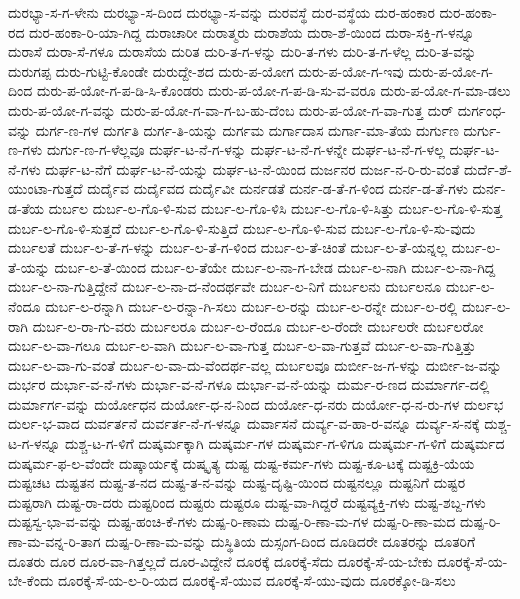 {ದುರಭ್ಯಾ-ಸ-ಗ-ಳೇನು
ದುರಭ್ಯಾ-ಸ-ದಿಂದ
ದುರಭ್ಯಾ-ಸ-ವನ್ನು
ದುರವಸ್ಥೆ
ದುರ-ವಸ್ಥೆಯ
ದುರ-ಹಂಕಾರ
ದುರ-ಹಂಕಾ-ರದ
ದುರ-ಹಂಕಾ-ರಿ-ಯಾ-ಗಿದ್ದ
ದುರಾಚಾರೀ
ದುರಾತ್ಮರು
ದುರಾಶೆಯ
ದುರಾ-ಶೆ-ಯಿಂದ
ದುರಾ-ಸಕ್ತಿ-ಗ-ಳನ್ನೂ
ದುರಾಸೆ
ದುರಾ-ಸೆ-ಗಳೂ
ದುರಾಸೆಯ
ದುರಿತ
ದುರಿ-ತ-ಗ-ಳನ್ನು
ದುರಿ-ತ-ಗಳು
ದುರಿ-ತ-ಗ-ಳೆಲ್ಲ
ದುರಿ-ತ-ವನ್ನು
ದುರುಗಪ್ಪ
ದುರು-ಗುಟ್ಟಿ-ಕೊಂಡೇ
ದುರುದ್ದೇ-ಶದ
ದುರು-ಪ-ಯೋಗ
ದುರು-ಪ-ಯೋ-ಗ-ಇವು
ದುರು-ಪ-ಯೋ-ಗ-ದಿಂದ
ದುರು-ಪ-ಯೋ-ಗ-ಪ-ಡಿ-ಸಿ-ಕೊಂಡರು
ದುರು-ಪ-ಯೋ-ಗ-ಪ-ಡಿ-ಸು-ವ-ವರೂ
ದುರು-ಪ-ಯೋ-ಗ-ಮಾ-ಡಲು
ದುರು-ಪ-ಯೋ-ಗ-ವನ್ನು
ದುರು-ಪ-ಯೋ-ಗ-ವಾ-ಗ-ಬ-ಹು-ದೆಂಬ
ದುರು-ಪ-ಯೋ-ಗ-ವಾ-ಗುತ್ತ
ದುರ್
ದುರ್ಗಂಧ-ವನ್ನು
ದುರ್ಗ-ಣ-ಗಳ
ದುರ್ಗತಿ
ದುರ್ಗ-ತಿ-ಯನ್ನು
ದುರ್ಗಮ
ದುರ್ಗಾದಾಸ
ದುರ್ಗಾ-ಮಾ-ತೆಯ
ದುರ್ಗುಣ
ದುರ್ಗು-ಣ-ಗಳು
ದುರ್ಗು-ಣ-ಗ-ಳೆಲ್ಲವೂ
ದುರ್ಘ-ಟ-ನೆ-ಗ-ಳನ್ನು
ದುರ್ಘ-ಟ-ನೆ-ಗ-ಳನ್ನೇ
ದುರ್ಘ-ಟ-ನೆ-ಗ-ಳಲ್ಲ
ದುರ್ಘ-ಟ-ನೆ-ಗಳು
ದುರ್ಘ-ಟ-ನೆಗೆ
ದುರ್ಘ-ಟ-ನೆ-ಯನ್ನು
ದುರ್ಘ-ಟ-ನೆ-ಯಿಂದ
ದುರ್ಜನರ
ದುರ್ಜ-ನ-ರಿ-ರು-ವಂತೆ
ದುರ್ದೆ-ಶೆ-ಯುಂಟಾ-ಗುತ್ತದೆ
ದುರ್ದೈವ
ದುರ್ದೈವದ
ದುರ್ದೈವೀ
ದುರ್ನಡತೆ
ದುರ್ನ-ಡ-ತೆ-ಗ-ಳಿಂದ
ದುರ್ನ-ಡ-ತೆ-ಗಳು
ದುರ್ನ-ಡ-ತೆಯ
ದುರ್ಬಲ
ದುರ್ಬ-ಲ-ಗೊ-ಳಿ-ಸುವ
ದುರ್ಬ-ಲ-ಗೊ-ಳಿಸಿ
ದುರ್ಬ-ಲ-ಗೊ-ಳಿ-ಸಿತ್ತು
ದುರ್ಬ-ಲ-ಗೊ-ಳಿ-ಸುತ್ತ
ದುರ್ಬ-ಲ-ಗೊ-ಳಿ-ಸುತ್ತದೆ
ದುರ್ಬ-ಲ-ಗೊ-ಳಿ-ಸುತ್ತಿದೆ
ದುರ್ಬ-ಲ-ಗೊ-ಳಿ-ಸುವ
ದುರ್ಬ-ಲ-ಗೊ-ಳಿ-ಸು-ವುದು
ದುರ್ಬಲತೆ
ದುರ್ಬ-ಲ-ತೆ-ಗ-ಳನ್ನು
ದುರ್ಬ-ಲ-ತೆ-ಗ-ಳಿಂದ
ದುರ್ಬ-ಲ-ತೆ-ಚಿಂತೆ
ದುರ್ಬ-ಲ-ತೆ-ಯನ್ನಲ್ಲ
ದುರ್ಬ-ಲ-ತೆ-ಯನ್ನು
ದುರ್ಬ-ಲ-ತೆ-ಯಿಂದ
ದುರ್ಬ-ಲ-ತೆಯೇ
ದುರ್ಬ-ಲ-ನಾ-ಗ-ಬೇಡ
ದುರ್ಬ-ಲ-ನಾಗಿ
ದುರ್ಬ-ಲ-ನಾ-ಗಿದ್ದ
ದುರ್ಬ-ಲ-ನಾ-ಗುತ್ತಿದ್ದೇನೆ
ದುರ್ಬ-ಲ-ನಾ-ದ-ನೆಂದರ್ಥವೇ
ದುರ್ಬ-ಲ-ನಿಗೆ
ದುರ್ಬಲನು
ದುರ್ಬಲನೂ
ದುರ್ಬ-ಲ-ನೆಂದೂ
ದುರ್ಬ-ಲ-ರನ್ನಾಗಿ
ದುರ್ಬ-ಲ-ರನ್ನಾ-ಗಿ-ಸಲು
ದುರ್ಬ-ಲ-ರನ್ನು
ದುರ್ಬ-ಲ-ರನ್ನೇ
ದುರ್ಬ-ಲ-ರಲ್ಲಿ
ದುರ್ಬ-ಲ-ರಾಗಿ
ದುರ್ಬ-ಲ-ರಾ-ಗು-ವರು
ದುರ್ಬಲರೂ
ದುರ್ಬ-ಲ-ರೆಂದೂ
ದುರ್ಬ-ಲ-ರೆಂದೇ
ದುರ್ಬಲರೇ
ದುರ್ಬಲರೋ
ದುರ್ಬ-ಲ-ವಾ-ಗಲೂ
ದುರ್ಬ-ಲ-ವಾಗಿ
ದುರ್ಬ-ಲ-ವಾ-ಗುತ್ತ
ದುರ್ಬ-ಲ-ವಾ-ಗುತ್ತವೆ
ದುರ್ಬ-ಲ-ವಾ-ಗುತ್ತಿತ್ತು
ದುರ್ಬ-ಲ-ವಾ-ಗು-ವಂತೆ
ದುರ್ಬ-ಲ-ವಾ-ದು-ವೆಂದರ್ಥ-ವಲ್ಲ
ದುರ್ಬಲವೂ
ದುರ್ಬೀ-ಜ-ಗ-ಳನ್ನು
ದುರ್ಬೀ-ಜ-ವನ್ನು
ದುರ್ಭರ
ದುರ್ಭಾ-ವ-ನೆ-ಗಳು
ದುರ್ಭಾ-ವ-ನೆ-ಗಳೂ
ದುರ್ಭಾ-ವ-ನೆ-ಯನ್ನು
ದುರ್ಮ-ರ-ಣದ
ದುರ್ಮಾರ್ಗ-ದಲ್ಲಿ
ದುರ್ಮಾರ್ಗ-ವನ್ನು
ದುರ್ಯೋಧನ
ದುರ್ಯೋ-ಧ-ನ-ನಿಂದ
ದುರ್ಯೋ-ಧ-ನರು
ದುರ್ಯೋ-ಧ-ನ-ರು-ಗಳ
ದುರ್ಲಭ
ದುರ್ಲ-ಭ-ವಾದ
ದುರ್ವರ್ತನೆ
ದುರ್ವರ್ತ-ನೆ-ಗ-ಳನ್ನೂ
ದುರ್ವಾಸನೆ
ದುರ್ವ್ಯ-ವ-ಹಾ-ರ-ವನ್ನೂ
ದುರ್ವ್ಯ-ಸ-ನಕ್ಕೆ
ದುಶ್ಚ-ಟ-ಗ-ಳನ್ನೂ
ದುಶ್ಚ-ಟ-ಗ-ಳಿಗೆ
ದುಷ್ಕರ್ಮಕ್ಕಾಗಿ
ದುಷ್ಕರ್ಮ-ಗಳ
ದುಷ್ಕರ್ಮ-ಗ-ಳಿಗೂ
ದುಷ್ಕರ್ಮ-ಗ-ಳಿಗೆ
ದುಷ್ಕರ್ಮದ
ದುಷ್ಕರ್ಮ-ಫ-ಲ-ವೆಂದೇ
ದುಷ್ಕಾರ್ಯಕ್ಕೆ
ದುಷ್ಕೃತ್ಯ
ದುಷ್ಟ
ದುಷ್ಟ-ಕರ್ಮ-ಗಳು
ದುಷ್ಟ-ಕೂ-ಟಕ್ಕೆ
ದುಷ್ಟಕ್ರಿ-ಯೆಯ
ದುಷ್ಟಚಟ
ದುಷ್ಟತನ
ದುಷ್ಟ-ತ-ನದ
ದುಷ್ಟ-ತ-ನ-ವನ್ನು
ದುಷ್ಟ-ದೃಷ್ಟಿ-ಯಿಂದ
ದುಷ್ಟನಲ್ಲೂ
ದುಷ್ಟನಿಗೆ
ದುಷ್ಟರ
ದುಷ್ಟರಾಗಿ
ದುಷ್ಟ-ರಾ-ದರು
ದುಷ್ಟರಿಂದ
ದುಷ್ಟರು
ದುಷ್ಟರೂ
ದುಷ್ಟ-ವಾ-ಗಿದ್ದರೆ
ದುಷ್ಟವ್ಯಕ್ತಿ-ಗಳು
ದುಷ್ಟ-ಶಬ್ದ-ಗಳು
ದುಷ್ಟಸ್ವ-ಭಾ-ವ-ವನ್ನು
ದುಷ್ಟ-ಹಂಚಿ-ಕೆ-ಗಳು
ದುಷ್ಪ-ರಿ-ಣಾಮ
ದುಷ್ಪ-ರಿ-ಣಾ-ಮ-ಗಳ
ದುಷ್ಪ-ರಿ-ಣಾ-ಮದ
ದುಷ್ಪ-ರಿ-ಣಾ-ಮ-ವನ್ನ-ರಿ-ತಾಗ
ದುಷ್ಪ-ರಿ-ಣಾ-ಮ-ವನ್ನು
ದುಸ್ಥಿತಿಯ
ದುಸ್ಸಂಗ-ದಿಂದ
ದೂಡಿದರೇ
ದೂತರನ್ನು
ದೂತರಿಗೆ
ದೂತರು
ದೂರ
ದೂರ-ವಾ-ಗಿತ್ತಲ್ಲದೆ
ದೂರ-ವಿದ್ದೇನೆ
ದೂರಕ್ಕೆ
ದೂರಕ್ಕೆ-ಸೆದು
ದೂರಕ್ಕೆ-ಸೆ-ಯ-ಬೇಕು
ದೂರಕ್ಕೆ-ಸೆ-ಯ-ಬೇ-ಕೆಂದು
ದೂರಕ್ಕೆ-ಸೆ-ಯ-ಲ-ರಿ-ಯದ
ದೂರಕ್ಕೆ-ಸೆ-ಯುವ
ದೂರಕ್ಕೆ-ಸೆ-ಯು-ವುದು
ದೂರಕ್ಕೋ-ಡಿ-ಸಲು
}
